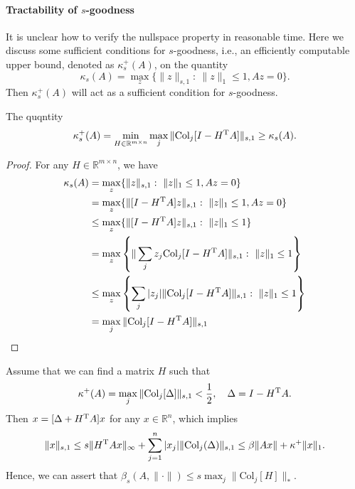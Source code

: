 \paragraph{Tractability of $s$-goodness}
It is unclear how to verify the nullspace property in reasonable time.
Here we discuss some sufficient conditions for $s$-goodness, i.e., an efficiently computable upper bound, denoted as $\kappa_s^+(A)$, on the quantity
\[
\kappa_s(A)=\max_{z}\{\|z\|_{s,1}:~\|z\|_1\le 1, Az=0\}.
\]
Then $\kappa_s^+(A)$ will act as a sufficient condition for $s$-goodness.
\begin{proposition}
The quqntity
\[
\kappa_s^+(A)=\min_{H\in\mathbb{R}^{m\times n}}\max_j\|\text{Col}_j[I - H^{\mathrm T} A]\|_{s,1}\ge \kappa_s(A).
\]
\end{proposition}
\begin{proof}
For any ${H\in\mathbb{R}^{m\times n}}$, we have
\begin{align*}
\kappa_s(A)&=\max_{z}\{\|z\|_{s,1}:~\|z\|_1\le 1, Az=0\}\\
&=\max_{z}\{\|[I-H^{\mathrm T} A]z\|_{s,1}:~\|z\|_1\le 1, Az=0\}\\
&\le \max_{z}\{\|[I-H^{\mathrm T} A]z\|_{s,1}:~\|z\|_1\le 1\}\\
&= \max_{z}\left\{\|\sum_jz_j\text{Col}_j[I - H^{\mathrm T} A]\|_{s,1}:~\|z\|_1\le 1\right\}\\
&\le \max_{z}\left\{\sum_j|z_j|\|\text{Col}_j[I - H^{\mathrm T} A]\|_{s,1}:~\|z\|_1\le 1\right\}\\
&=\max_j\|\text{Col}_j[I - H^{\mathrm T} A]\|_{s,1}
\end{align*}
\end{proof}
Assume that we can find a matrix $H$ such that
\[
\kappa^+(A)=\max_j\|\text{Col}_j[\Delta]\|_{s,1}<\frac{1}{2},\quad\Delta= I-H^{\mathrm T} A.
\]
Then $x=[\Delta +H^{\mathrm T} A]x$ for any $x\in\mathbb{R}^n$, which implies
\[
\|x\|_{s,1}\le s\|H^{\mathrm T} Ax\|_\infty + \sum_{j=1}^n|x_j|\|\text{Col}_j(\Delta)\|_{s,1}
\le\beta\|Ax\| + \kappa^+\|x\|_1.
\]
Hence, we can assert that $\beta_s(A,\|\cdot\|)\le s\max_j\|\text{Col}_j[H]\|_*$.

